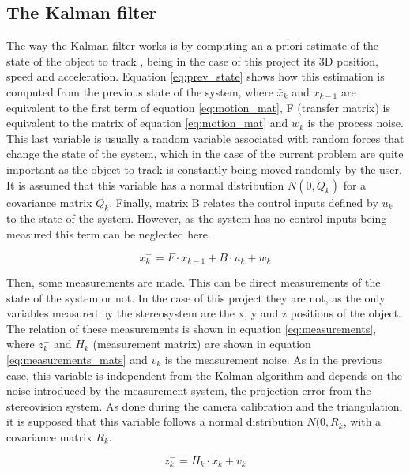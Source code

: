 \subsection{The Kalman filter}
The way the Kalman filter works is by computing an a priori estimate of the state of the object to track \cite{OReilly}, being in the case of this project its 3D position, speed and acceleration. Equation \eqref{eq:prev_state} shows how this estimation is computed from the previous state of the system, where $\bar{x}_{k}$ and $x_{k-1}$ are equivalent to the first term of equation \eqref{eq:motion_mat}, F (transfer matrix) is equivalent to the matrix of equation \eqref{eq:motion_mat} and $w_{k}$ is the process noise. This last variable is usually a random variable associated with random forces that change the state of the system, which in the case of the current problem are quite important as the object to track is constantly being moved randomly by the user. It is assumed that this variable has a normal distribution $N(0,Q_{k})$ for a covariance matrix $Q_{k}$.
Finally, matrix B relates the control inputs defined by $u_{k}$ to the state of the system. However, as the system has no control inputs being measured this term can be neglected here.

\begin{equation}
x_{k}^{-}=F \cdot x_{k-1}+B \cdot u_{k}+w_{k}
\label{eq:prev_state}
\end{equation}

Then, some measurements are made. This can be direct measurements of the state of the system or not. In the case of this project they are not, as the only variables measured by the stereosystem are the x, y and z positions of the object. The relation of these measurements is shown in equation \eqref{eq:measurements}, where $z_{k}^{-}$ and $H_{k}$ (measurement matrix) are shown in equation \eqref{eq:measurements_mats} and $v_{k}$ is the measurement noise. As in the previous case, this variable is independent from the Kalman algorithm and depends on the noise introduced by the measurement system, the projection error from the stereovision system. As done during the camera calibration and the triangulation, it is  supposed that this variable follows a normal distribution $N(0,R_{k}$, with a covariance matrix $R_{k}$.

\begin{equation}
z_{k}^{-}=H_{k} \cdot x_{k}+v_{k}
\label{eq:measurements}
\end{equation}

